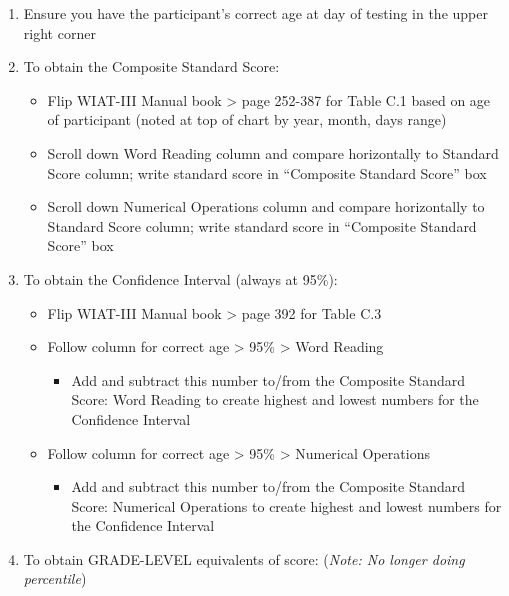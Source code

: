 \documentclass[
]{book}
\providecommand{\tightlist}{%
  \setlength{\itemsep}{0pt}\setlength{\parskip}{0pt}}
\begin{document}
\begin{enumerate}
\def\labelenumi{\arabic{enumi}.}
\tightlist
\item
  Ensure you have the participant's correct age at day of testing in the upper right corner
\item
  To obtain the Composite Standard Score:

  \begin{itemize}
  \tightlist
  \item
    Flip WIAT-III Manual book \textgreater{} page 252-387 for Table C.1 based on age of participant (noted at top of chart by year, month, days range)
  \item
    Scroll down Word Reading column and compare horizontally to Standard Score column; write standard score in ``Composite Standard Score'' box
  \item
    Scroll down Numerical Operations column and compare horizontally to Standard Score column; write standard score in ``Composite Standard Score'' box
  \end{itemize}
\item
  To obtain the Confidence Interval (always at 95\%):

  \begin{itemize}
  \tightlist
  \item
    Flip WIAT-III Manual book \textgreater{} page 392 for Table C.3
  \item
    Follow column for correct age \textgreater{} 95\% \textgreater{} Word Reading

    \begin{itemize}
    \tightlist
    \item
      Add and subtract this number to/from the Composite Standard Score: Word Reading to create highest and lowest numbers for the Confidence Interval
    \end{itemize}
  \item
    Follow column for correct age \textgreater{} 95\% \textgreater{} Numerical Operations

    \begin{itemize}
    \tightlist
    \item
      Add and subtract this number to/from the Composite Standard Score: Numerical Operations to create highest and lowest numbers for the Confidence Interval
    \end{itemize}
  \end{itemize}
\item
  To obtain GRADE-LEVEL equivalents of score: (\emph{Note: No longer doing percentile})


\end{enumerate}
\end{document}
